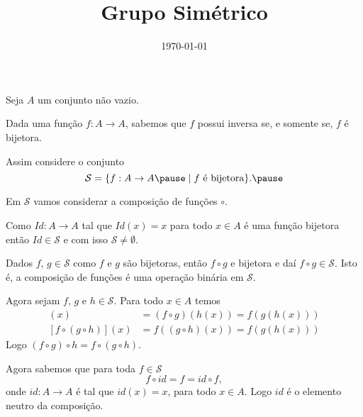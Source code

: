 \documentclass{beamer}
\title{Grupo Simétrico}
\author[\autor]{\autor}
\institute[\instituto]{\instituto}
\date{\today}
\begin{document}
    \begin{frame}
        \maketitle
    \end{frame}


    \begin{frame}
        Seja $A$ um conjunto n\~ao vazio.\pause

        \vspace{.3cm}

        Dada uma fun\c{c}\~ao $f : A \to A$, sabemos que $f$ possui inversa \pause se, e somente se, $f$ \'e bijetora.\pause

        \vspace{.3cm}

        Assim considere o conjunto\pause
        \[
            \mathcal{S} = \{ f : A \to A \pause \mid f \mbox{ \'e bijetora}\}.\pause
        \]
        
        \vspace{.3cm}

        Em $\mathcal{S}$ vamos considerar a composi\c{c}\~ao de fun\c{c}\~oes $\circ$. 

        \vspace{.3cm}

        Como $Id : A \to A$ tal que $Id(x) = x$ para todo $x \in A$ \'e uma fun\c{c}\~ao bijetora ent\~ao $Id \in \mathcal{S}$ e com isso $\mathcal{S} \ne \emptyset$. 
    \end{frame}

    \begin{frame}
        Dados $f$, $g \in \mathcal{S}$ como $f$ e $g$ são bijetoras, então $f \circ g$ e bijetora e daí $f \circ g \in \mathcal{S}$. Isto é, a composição de funções é uma operação binária em $\mathcal{S}$.

        \vspace{.3cm}

        Agora sejam $f$, $g$ e $h \in \mathcal{S}$. Para todo $x \in A$ temos
        \begin{align*}
            [(f\circ g)\circ h](x) &= (f \circ g)(h(x)) = f(g(h(x)))\\
            [f\circ(g\circ h)](x) &= f((g\circ h)(x)) = f(g(h(x)))
        \end{align*}
        Logo $(f\circ g)\circ h = f\circ(g\circ h)$.

        \vspace{.3cm}

        Agora sabemos que para toda $f \in \mathcal{S}$
        \[
            f\circ id = f = id\circ f,
        \]
        onde $id : A \to A$ é tal que $id(x) = x$, para todo $x \in A$. Logo $id$ \'e o elemento neutro da composi\c{c}\~ao.

    \end{frame}
\end{document}
